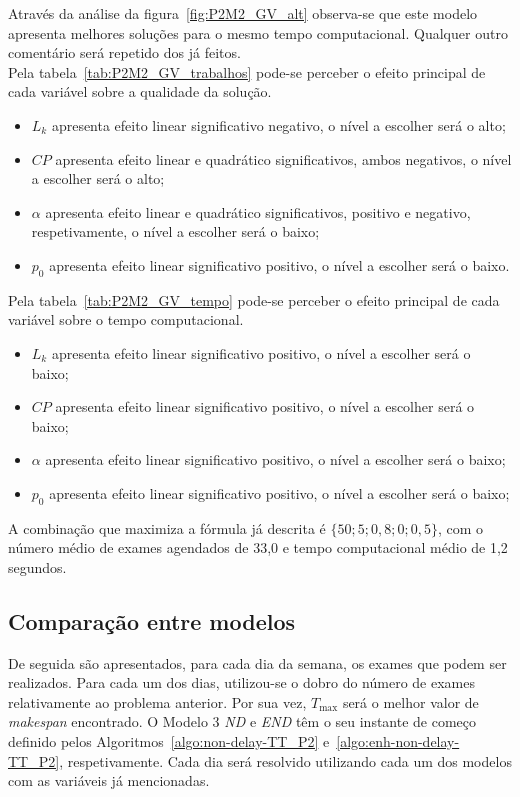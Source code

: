 Através da análise da figura~\ref{fig:P2M2_GV_alt} observa-se que este modelo apresenta melhores soluções para o mesmo tempo computacional. Qualquer outro comentário será repetido dos já feitos.\\

Pela tabela~\ref{tab:P2M2_GV_trabalhos} pode-se perceber o efeito principal de cada variável sobre a qualidade da solução.
\begin{itemize}
\item $L_{k}$ apresenta efeito linear significativo negativo, o nível a escolher será o alto;
\item $CP$ apresenta efeito linear e quadrático significativos, ambos negativos, o nível a escolher será o alto;
\item $\alpha$ apresenta efeito linear e quadrático significativos, positivo e negativo, respetivamente, o nível a escolher será o baixo;
\item $p_{0}$ apresenta efeito linear significativo positivo, o nível a escolher será o baixo.
\end{itemize}
Pela tabela~\ref{tab:P2M2_GV_tempo} pode-se perceber o efeito principal de cada variável sobre o tempo computacional.
\begin{itemize}
\item $L_{k}$ apresenta efeito linear significativo positivo, o nível a escolher será o baixo;
\item $CP$ apresenta efeito linear significativo positivo, o nível a escolher será o baixo;
\item $\alpha$ apresenta efeito linear significativo positivo, o nível a escolher será o baixo;
\item $p_{0}$ apresenta efeito linear significativo positivo, o nível a escolher será o baixo;
\end{itemize}

A combinação que maximiza a fórmula já descrita é $\{50; 5; 0,8; 0; 0,5\}$, com o número médio de exames agendados de 33,0 e tempo computacional médio de 1,2 segundos.\\

\subsection{Comparação entre modelos}

De seguida são apresentados, para cada dia da semana, os exames que podem ser realizados. Para cada um dos dias, utilizou-se o dobro do número de exames relativamente ao problema anterior. Por sua vez, $T_{\max}$ será o melhor valor de \textit{makespan} encontrado. O Modelo 3 \textit{ND} e \textit{END} têm o seu instante de começo definido pelos Algoritmos~\ref{algo:non-delay-TT_P2} e~\ref{algo:enh-non-delay-TT_P2}, respetivamente. Cada dia será resolvido utilizando cada um dos modelos com as variáveis já mencionadas.\\

